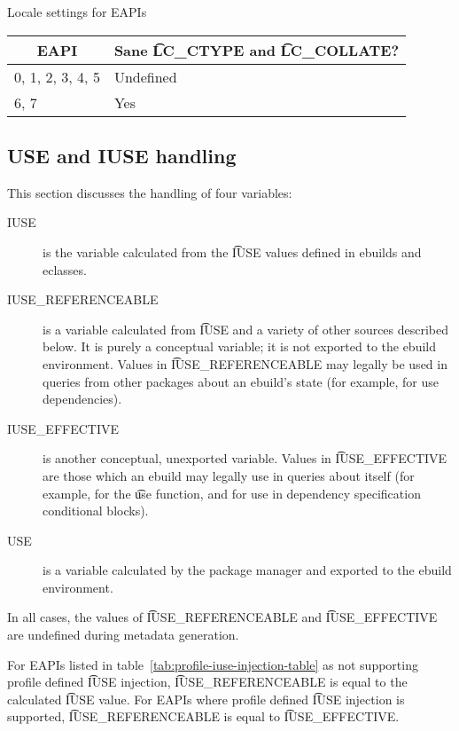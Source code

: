 \begin{centertable}{Locale settings for EAPIs}
    \label{tab:locale-settings}
    \begin{tabular}{ll}
      \toprule
      \multicolumn{1}{c}{\textbf{EAPI}} &
      \multicolumn{1}{c}{\textbf{Sane \t{LC_CTYPE} and \t{LC_COLLATE}?}} \\
      \midrule
      0, 1, 2, 3, 4, 5  & Undefined \\
      6, 7              & Yes       \\
      \bottomrule
    \end{tabular}
\end{centertable}

\subsection{USE and IUSE handling}
\label{sec:use-iuse-handling}

This section discusses the handling of four variables:

\begin{description}
\item[IUSE] is the variable calculated from the \t{IUSE} values defined in ebuilds and eclasses.
\item[IUSE_REFERENCEABLE] is a variable calculated from \t{IUSE} and a variety of other sources
    described below. It is purely a conceptual variable; it is not exported to the ebuild
    environment. Values in \t{IUSE_REFERENCEABLE} may legally be used in queries from other
    packages about an ebuild's state (for example, for use dependencies).
\item[IUSE_EFFECTIVE] is another conceptual, unexported variable. Values in \t{IUSE_EFFECTIVE} are
    those which an ebuild may legally use in queries about itself (for example, for the \t{use}
    function, and for use in dependency specification conditional blocks).
\item[USE] is a variable calculated by the package manager and exported to the ebuild environment.
\end{description}

In all cases, the values of \t{IUSE_REFERENCEABLE} and \t{IUSE_EFFECTIVE} are undefined during
metadata generation.

For EAPIs listed in table~\ref{tab:profile-iuse-injection-table} as not supporting profile defined
\t{IUSE} injection, \t{IUSE_REFERENCEABLE} is equal to the calculated \t{IUSE} value. For EAPIs
where profile defined \t{IUSE} injection is supported, \t{IUSE_REFERENCEABLE} is equal to
\t{IUSE_EFFECTIVE}.

